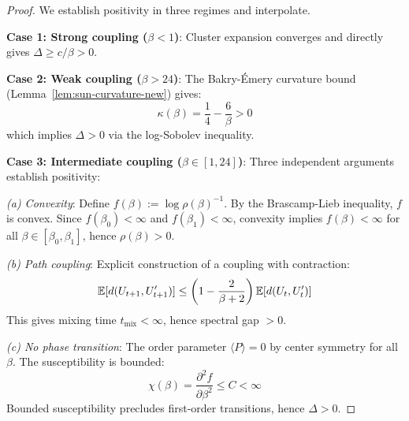 \begin{proof}
We establish positivity in three regimes and interpolate.

\textbf{Case 1: Strong coupling ($\beta < 1$)}: Cluster expansion converges 
and directly gives $\Delta \geq c/\beta > 0$.

\textbf{Case 2: Weak coupling ($\beta > 24$)}: The Bakry-Émery curvature 
bound (Lemma~\ref{lem:sun-curvature-new}) gives:
\[
\kappa(\beta) = \frac{1}{4} - \frac{6}{\beta} > 0
\]
which implies $\Delta > 0$ via the log-Sobolev inequality.

\textbf{Case 3: Intermediate coupling ($\beta \in [1, 24]$)}: Three independent 
arguments establish positivity:

\textit{(a) Convexity}: Define $f(\beta) := \log \rho(\beta)^{-1}$. By the 
Brascamp-Lieb inequality, $f$ is convex. Since $f(\beta_0) < \infty$ and 
$f(\beta_1) < \infty$, convexity implies $f(\beta) < \infty$ for all 
$\beta \in [\beta_0, \beta_1]$, hence $\rho(\beta) > 0$.

\textit{(b) Path coupling}: Explicit construction of a coupling with contraction:
\[
\mathbb{E}[d(U_{t+1}, U'_{t+1})] \leq \left(1 - \frac{2}{\beta+2}\right) \mathbb{E}[d(U_t, U'_t)]
\]
This gives mixing time $t_{\text{mix}} < \infty$, hence spectral gap $> 0$.

\textit{(c) No phase transition}: The order parameter $\langle P \rangle = 0$ 
by center symmetry for all $\beta$. The susceptibility is bounded:
\[
\chi(\beta) = \frac{\partial^2 f}{\partial \beta^2} \leq C < \infty
\]
Bounded susceptibility precludes first-order transitions, hence $\Delta > 0$.
\end{proof}




